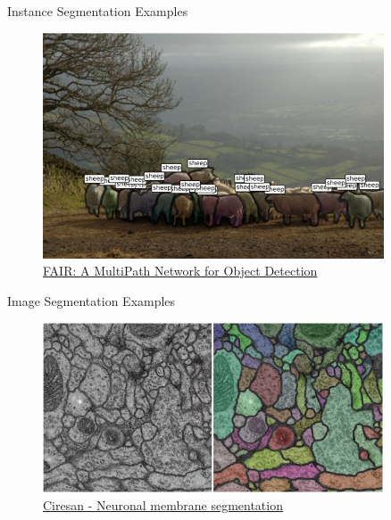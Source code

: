 \documentclass[handout]{beamer}
\begin{document}
\begin{frame}{Instance Segmentation Examples}
\begin{figure}
\includegraphics[width=0.9\textwidth,keepaspectratio]{../media/multipath_network_1.jpg}
\caption{\href{https://arxiv.org/abs/1405.0312v3}{\color{blue}FAIR: A MultiPath Network for Object Detection}}
\end{figure}
\end{frame}


\begin{frame}{Image Segmentation Examples}
\begin{figure}
\includegraphics[width=0.9\textwidth,keepaspectratio]{../media/neuronal_segmentation.png}
\caption{\href{https://papers.nips.cc/paper/4741-deep-neural-networks-segment-neuronal-membranes-in-electron-microscopy-images}{\color{blue}Ciresan - Neuronal membrane segmentation}}
\end{figure}
\end{frame}
\end{document}
